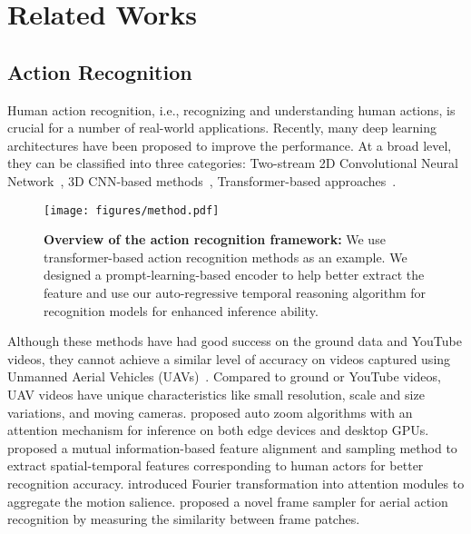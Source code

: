 \documentclass[letterpaper, 10 pt, conference]{ieeeconf}
\begin{document}
 \section{Related Works}
\subsection{Action Recognition}
Human action recognition, i.e., recognizing and understanding human actions, is crucial for a number of real-world applications. Recently,  many deep learning architectures have been proposed to improve the performance. At a broad level, they can be classified into three categories: Two-stream 2D Convolutional Neural Network~\cite{simonyan2014two,karpathy2014large,wang2015action,sanchez2013image,cheron2015p,girdhar2017actionvlad}, 3D CNN-based methods~\cite{tran2015learning,ji20123d,zhang2020few,li2020directional,carreira2017quo}, Transformer-based approaches~\cite{arnab2021vivit, bertasius2021space,wang2021oadtr}.



















\begin{figure*}[!h]
    \centering
    \texttt{[image: figures/method.pdf]}
    \caption{{\bf Overview of the action recognition framework:} We use transformer-based action recognition methods as an example. We designed a prompt-learning-based encoder to help better extract the feature and use our auto-regressive temporal reasoning algorithm for recognition models for enhanced inference ability. }
    \label{fig:overview_method} 
    \vspace{-3mm}
\end{figure*}

Although these methods have had good success on the ground data and YouTube videos, they cannot achieve a similar level of accuracy on videos captured using Unmanned Aerial Vehicles (UAVs)~\cite{wang2023aztr,xian2023pmi}. Compared to ground or YouTube videos, UAV videos have unique characteristics like small resolution, scale and size variations, and moving cameras. 
\cite{wang2023aztr} proposed auto zoom algorithms with an attention mechanism for inference on both edge devices and desktop GPUs. 
\cite{xian2023mitfas} proposed a mutual information-based feature alignment and sampling method to extract spatial-temporal features corresponding to human actors for better recognition accuracy. \cite{Kothandaraman2022FARFA} introduced Fourier transformation into attention modules to aggregate the motion salience. \cite{xian2023pmi} proposed a novel frame sampler for aerial action recognition by measuring the similarity between frame patches.
\end{document}
